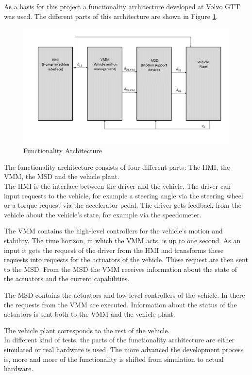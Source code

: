 \documentclass[ExampleMasters.tex]{subfiles}
\begin{document}
As a basis for this project a functionality architecture developed at Volvo GTT was used. The different parts of this architecture are shown in Figure \ref{fig:funct_architecture}.

\begin{figure}[!htb]
	\centering
	\includegraphics[width=1\linewidth]{figures/functionality_architecture}
	
	\caption{Functionality Architecture}
	\label{fig:funct_architecture}
\end{figure}

The functionality architecture consists of four different parts: The \gls{HMI}, the \gls{VMM}, the \gls{MSD} and the vehicle plant.\\
The \gls{HMI} is the interface between the driver and the vehicle. The driver can input requests to the vehicle, for example a steering angle via the steering wheel or a torque request via the accelerator pedal. The driver gets feedback from the vehicle about the vehicle's state, for example via the speedometer.

The \gls{VMM} contains the high-level controllers for the vehicle's motion and stability. The time horizon, in which the \gls{VMM} acts, is up to one second. As an input it gets the request of the driver from the \gls{HMI} and transforms these requests into requests for the actuators of the vehicle. These request are then sent to the \gls{MSD}. From the \gls{MSD} the \gls{VMM} receives information about the state of the actuators and the current capabilities.

The \gls{MSD} contains the actuators and low-level controllers of the vehicle. In there the requests from the \gls{VMM} are executed. Information about the status of the actuators is sent both to the \gls{VMM} and the vehicle plant.

The vehicle plant corresponds to the rest of the vehicle.
\\
In different kind of tests, the parts of the functionality architecture are either simulated or real hardware is used. The more advanced the development process is, more and more of the functionality is shifted from simulation to actual hardware.
\end{document}
